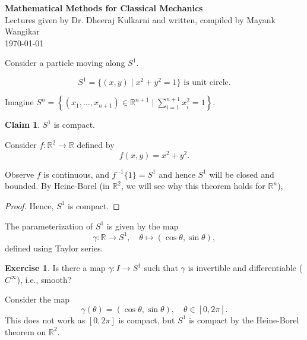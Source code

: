 \documentclass[11pt]{article}
\theoremstyle{definition}
\newtheorem{definition}{Definition}[section]
\newtheorem{claim}{Claim}
\newtheorem{exercise}{Exercise}
\theoremstyle{remark}
\begin{document}
\begin{center}
{\Large\textbf{Mathematical Methods for Classical Mechanics}}\\
\vspace{0.3cm}
{\normalsize{Lectures given by Dr. Dheeraj Kulkarni and written, compiled by Mayank Wangikar}}\\
\vspace{0.3cm}
{\normalsize\today}
\end{center}
\vspace{0.5cm}

Consider a particle moving along $S^1$.

\[ S^1 = \{(x, y) \mid x^2 + y^2 = 1 \} \text{ is unit circle.} \]

Imagine $S^n = \left\{ (x_1, \ldots, x_{n+1}) \in \mathbb{R}^{n+1} \mid \sum_{i=1}^{n+1} x_i^2 = 1 \right\}$.

\begin{claim}\label{clm:s1_compact}
$S^1$ is compact.
\end{claim}

Consider $f \colon \mathbb{R}^2 \to \mathbb{R}$ defined by
\[ f(x, y) = x^2 + y^2. \]

Observe $f$ is continuous, and $f^{-1}\{1\} = S^1$ and hence $S^1$ will be closed and bounded. By Heine-Borel (in $\mathbb{R}^2$, we will see why this theorem holds for $\mathbb{R}^n$),

\begin{proof}
Hence, $S^1$ is compact.
\end{proof}

The parameterization of $S^1$ is given by the map
\[
\gamma \colon \mathbb{R} \to S^1, \quad \theta \mapsto (\cos \theta, \sin \theta),
\]
defined using Taylor series.

\begin{exercise}
Is there a map $\gamma \colon I \to S^1$ such that $\gamma$ is invertible and differentiable ($C^\infty$), i.e., smooth?
\end{exercise}

Consider the map
\[
\gamma(\theta) = (\cos \theta, \sin \theta), \quad \theta \in [0, 2\pi].
\]
This does not work as $[0, 2\pi]$ is compact, but $S^1$ is compact by the Heine-Borel theorem on $\mathbb{R}^2$.
\end{document}
